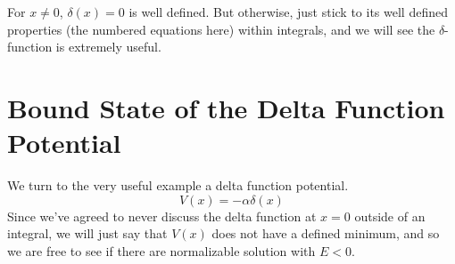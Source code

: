 \documentclass[12pt]{book}
\begin{document}
For $x \neq 0$, $\delta(x) = 0$ is well defined.  But otherwise, just stick to its well defined properties (the numbered equations here) within integrals, and we will see the $\delta$-function is extremely useful.

\section{Bound State of the Delta Function Potential}

We turn to the very useful example a delta function potential.
\begin{equation}
V(x) = -\alpha \delta(x) 
\end{equation}
Since we've agreed to never discuss the delta function at $x=0$ outside of an integral, we will just say that $V(x)$ does not have a defined minimum, and so we are free to see if there are normalizable solution with $E<0$.  
\end{document}
